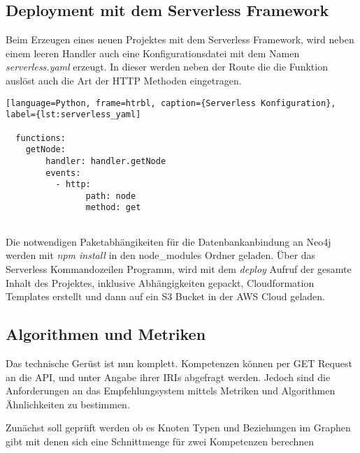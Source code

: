\subsection{Deployment mit dem Serverless Framework}

Beim Erzeugen eines neuen Projektes mit dem Serverless Framework, wird neben einem leeren Handler auch eine Konfigurationsdatei mit dem Namen \textit{serverless.yaml} erzeugt. In dieser werden neben der Route die die Funktion auslöst auch die Art der HTTP Methoden eingetragen.

\begin{lstlisting}[language=Python, frame=htrbl, caption={Serverless Konfiguration}, label={lst:serverless_yaml]

  functions:
  	getNode:
    	handler: handler.getNode
    	events: 
          - http: 
            	path: node 
         		method: get 
         		
\end{lstlisting}

Die notwendigen Paketabhängikeiten für die Datenbankanbindung an Neo4j werden mit \textit{npm install} in den node_modules Ordner geladen. Über das Serverless Kommandozeilen Programm, wird mit dem \textit{deploy} Aufruf der gesamte Inhalt des Projektes, inklusive Abhängigkeiten gepackt, Cloudformation Templates erstellt und dann auf ein S3 Bucket in der AWS Cloud geladen. 

\subsection{Algorithmen und Metriken}

Das technische Gerüst ist nun komplett. Kompetenzen können per GET Request an die API, und unter Angabe ihrer IRIs abgefragt werden. Jedoch sind die Anforderungen an das Empfehlungsystem mittels Metriken und Algorithmen Ähnlichkeiten zu bestimmen. 

Zunächst soll geprüft werden ob es Knoten Typen und Beziehungen im Graphen gibt mit denen sich eine Schnittmenge für zwei Kompetenzen berechnen 
